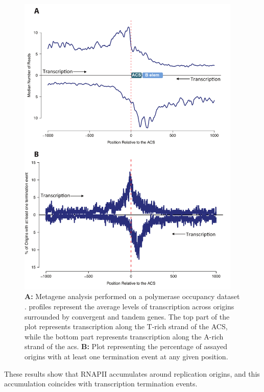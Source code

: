 \begin{figure}[hp!]

\centering
\includegraphics[width=0.95\textwidth]{figures/results/metagenes}
\caption[Metagene analyses showing polymerase occupancy and termination around replication origins]{\textbf{A: }Metagene analysis performed on a polymerase occupancy dataset \cite{schaughency:2014:genomewide}. profiles represent the average levels of transcription across origins surrounded by convergent and tandem genes. The top part of the plot represents transcription along the T-rich strand of the ACS, while the bottom part represents transcription along the A-rich strand of the acs. \textbf{B: } Plot representing the percentage of assayed origins with at least one termination event at any given position. }
\label{fig:metagenes}

\end{figure}  
These results show that RNAPII accumulates around replication origins, and this accumulation coincides with transcription termination events. 
  

